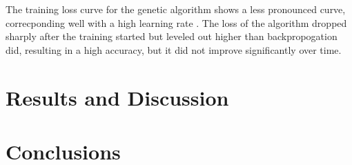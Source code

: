 \documentclass[12pt]{article}
\begin{document}
        The training loss curve for the genetic algorithm shows a less pronounced curve, correcponding well with a high
        learning rate \cite{goodLoss}.  The loss of the algorithm dropped sharply after the training started but leveled out higher than
        backpropogation did, resulting in a high accuracy, but it did not improve significantly over time.
\section{Results and Discussion}

\section{Conclusions}

\pagebreak


\end{document}
